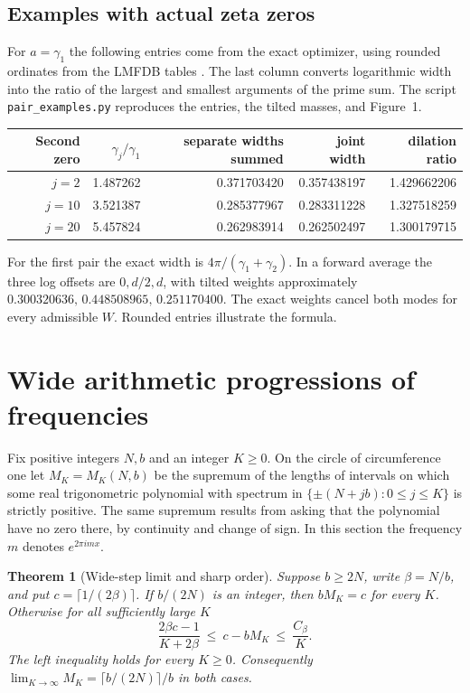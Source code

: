 \documentclass[11pt,letterpaper]{article}
\newtheorem{theorem}{Theorem}[section]
\theoremstyle{remark}\newtheorem{remark}[theorem]{Remark}
\begin{document}
\subsection*{Examples with actual zeta zeros}
For $a=\gamma_1$ the following entries come from the exact optimizer,
using rounded ordinates from the LMFDB tables \cite{LMFDB}. The last
column converts logarithmic width into the ratio of the largest and smallest
arguments of the prime sum. The script \texttt{pair\_examples.py} reproduces
the entries, the tilted masses, and Figure~1.
\begin{center}
\begin{tabular}{rrrrr}
\toprule
Second zero & $\gamma_j/\gamma_1$ & separate widths summed & joint width & dilation ratio\\
\midrule
$j=2$  & 1.487262 & 0.371703420 & 0.357438197 & 1.429662206\\
$j=10$ & 3.521387 & 0.285377967 & 0.283311228 & 1.327518259\\
$j=20$ & 5.457824 & 0.262983914 & 0.262502497 & 1.300179715\\
\bottomrule
\end{tabular}
\end{center}
For the first pair the exact width is $4\pi/(\gamma_1+\gamma_2)$.
In a forward average the three log offsets are $0,d/2,d$, with tilted
weights approximately $0.300320636,\,0.448508965,\,0.251170400$.
The exact weights cancel both modes for every admissible $W$.
Rounded entries illustrate the formula.


\section{Wide arithmetic progressions of frequencies}
\label{sec:progressions}
Fix positive integers $N,b$ and an integer $K\ge0$. On the circle of
circumference one let $M_K=M_K(N,b)$ be the supremum of the lengths of
intervals on which some real trigonometric polynomial with spectrum in
$\{\pm(N+jb):0\le j\le K\}$ is strictly positive. The same supremum
results from asking that the polynomial have no zero there, by continuity
and change of sign. In this section the frequency $m$ denotes $e^{2\pi i m x}$.

\begin{theorem}[Wide-step limit and sharp order]\label{thm:wide}
Suppose $b\ge2N$, write $\beta=N/b$, and put $c=\lceil1/(2\beta)\rceil$.
If $b/(2N)$ is an integer, then $bM_K=c$ for every $K$.
Otherwise for all sufficiently large $K$
\begin{equation}\label{eq:rate}
   \frac{2\beta c-1}{K+2\beta}
       \ \le\ c-bM_K\ \le\ \frac{C_\beta}{K}.
\end{equation}
The left inequality holds for every $K\ge0$. Consequently
$\lim_{K\to\infty}M_K=\lceil b/(2N)\rceil/b$ in both cases.
\end{theorem}
\end{document}
